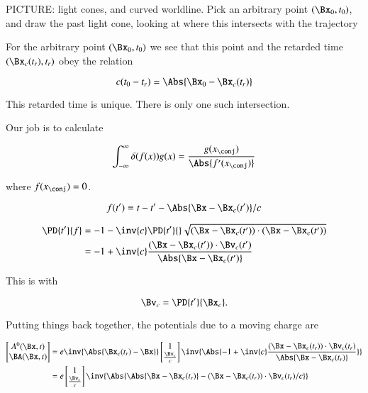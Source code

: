 PICTURE: light cones, and curved worldline.  Pick an arbitrary point $(\Bx_0, t_0)$, and draw the past light cone, looking at where this intersects with the trajectory

For the arbitrary point $(\Bx_0, t_0)$ we see that this point and the retarded time $(\Bx_c(t_r), t_r)$ obey the relation

\begin{equation}\label{eqn:relativisticElectrodynamicsL18:190}
c (t_0 - t_r) = \Abs{\Bx_0 - \Bx_c(t_r)}
\end{equation}

This retarded time is unique.  There is only one such intersection.

Our job is to calculate

\begin{equation}\label{eqn:relativisticElectrodynamicsL18:210}
\int_{-\infty}^\infty \delta(f(x)) g(x) = \frac{g(x_\conj)}{\Abs{f'(x_\conj)}}
\end{equation}

where $f(x_\conj) = 0$.

\begin{equation}\label{eqn:relativisticElectrodynamicsL18:230}
f(t') = t - t' - \Abs{\Bx - \Bx_c(t')}/c
\end{equation}

\begin{align*}
\PD{t'}{f}
&= -1 - \inv{c} \PD{t'}{} \sqrt{ (\Bx - \Bx_c(t')) \cdot (\Bx - \Bx_c(t')) } \\
&= -1 + \inv{c} \frac{(\Bx - \Bx_c(t')) \cdot \Bv_c(t')}{\Abs{\Bx - \Bx_c(t')}} 
\end{align*}

This is with

\begin{equation}\label{eqn:relativisticElectrodynamicsL18:700}
\Bv_c = \PD{t'}{\Bx_c}.
\end{equation}

Putting things back together, the potentials due to a moving charge are 

\begin{align*}
\begin{bmatrix}
A^0(\Bx, t) \\
\BA(\Bx, t)
\end{bmatrix}
&=
e \inv{\Abs{\Bx_c(t_r) - \Bx}}
\begin{bmatrix}
1 \\
\frac{\Bv_c}{c}
\end{bmatrix}
\inv{\Abs{
-1 + \inv{c} \frac{(\Bx - \Bx_c(t_r)) \cdot \Bv_c(t_r)}{\Abs{\Bx - \Bx_c(t_r)}} 
}
} \\
&=
e 
\begin{bmatrix}
1 \\
\frac{\Bv_c}{c}
\end{bmatrix}
\inv{\Abs{
\Abs{\Bx - \Bx_c(t_r)} - (\Bx - \Bx_c(t_r)) \cdot \Bv_c(t_r)/c
} }
\end{align*}

